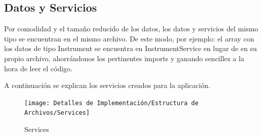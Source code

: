 \documentclass[12pt,twoside,titlepage]{report}
\begin{document}
\subsection{Datos y Servicios}
Por comodidad y el tamaño reducido de los datos, los datos y servicios del mismo tipo se encuentran en el mismo archivo. De este modo, por ejemplo: el array con los datos de tipo Instrument se encuentra en InstrumentService en lugar de en su propio archivo, ahorrándonos los pertinentes imports y ganando sencillez a la hora de leer el código.

A continuación se explican los servicios creados para la aplicación.

\begin{figure}[H]
    \centering
    \texttt{[image: Detalles de Implementación/Estructura de Archivos/Services]}
    \label{fig:Services}
    \caption{Services}
\end{figure}
\end{document}
